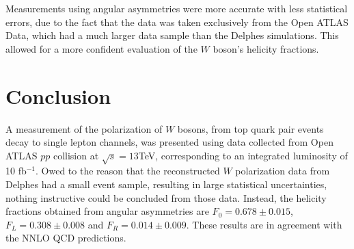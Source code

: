 \documentclass[12pt,a4paper]{article}
\numberwithin{equation}{section}
\begin{document}
Measurements using angular asymmetries were more accurate with less statistical
errors, due to the fact that the data was taken exclusively from the Open ATLAS
Data, which had a much larger data sample than the Delphes simulations. This
allowed for a more confident evaluation of the $W$ boson's helicity fractions.\\










\section{Conclusion}
A measurement of the polarization of $W$ bosons, from top quark pair events
decay to single lepton channels, was presented using data collected from Open
ATLAS $pp$ collision at $\sqrt s = 13$TeV, corresponding to an integrated
luminosity of 10 fb$^{-1}$. Owed to the reason that the reconstructed $W$
polarization data from Delphes had a small event sample, resulting in large
statistical uncertainties, nothing instructive could be concluded from those
data. Instead, the helicity fractions obtained from angular asymmetries are
$F_0=0.678 \pm 0.015$, $F_L=0.308 \pm 0.008$ and $F_R=0.014 \pm 0.009$. These
results are in agreement with the NNLO QCD predictions.


\printbibliography
\end{document}
